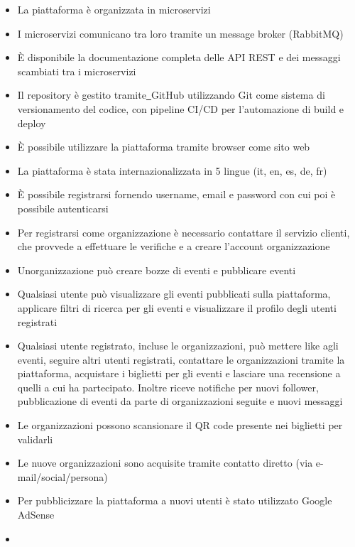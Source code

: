 \documentclass[11pt,a4paper]{article}
\providecommand{\tightlist}{\setlength{\itemsep}{0pt}\setlength{\parskip}{0pt}}
\begin{document}
\begin{itemize}
\tightlist
\item
  {La piattaforma è organizzata in microservizi }
\item
  {I microservizi comunicano tra loro tramite un message broker (RabbitMQ)}
\item
  {È disponibile la documentazione completa delle API REST e dei messaggi scambiati tra i microservizi}
\item
  {Il repository è gestito tramite}{\href{https://www.google.com/url?q=https://github.com?utm_source\%3Dchatgpt.com&sa=D&source=editors&ust=1779895503448419&usg=AOvVaw2jJ5FpVsgQ4hFvQu20lJHB}{~}}{GitHub utilizzando Git come sistema di versionamento del codice, con pipeline CI/CD per l’automazione di build e deploy}
\item
  {È possibile utilizzare la piattaforma tramite browser come sito web}
\item
  {La piattaforma è stata internazionalizzata in 5 lingue (it, en, es, de, fr)}
\item
  {È possibile registrarsi fornendo username, email e password con cui poi è possibile autenticarsi}
\item
  {Per registrarsi come organizzazione è necessario contattare il servizio clienti, che provvede a effettuare le verifiche e a creare l'account organizzazione}
\item
  {Un\textquotesingle organizzazione può creare bozze di eventi e pubblicare eventi}
\item
  {Qualsiasi utente può visualizzare gli eventi pubblicati sulla piattaforma, applicare filtri di ricerca per gli eventi e visualizzare il profilo degli utenti registrati}
\item
  {Qualsiasi utente registrato, incluse le organizzazioni, può mettere like agli eventi, seguire altri utenti registrati, contattare le organizzazioni tramite la piattaforma, acquistare i biglietti per gli eventi e lasciare una recensione a quelli a cui ha partecipato. Inoltre riceve notifiche per nuovi follower, pubblicazione di eventi da parte di organizzazioni seguite e nuovi messaggi}
\item
  {Le organizzazioni possono scansionare il QR code presente nei biglietti per }{validarli}
\item
  {Le nuove organizzazioni sono acquisite tramite contatto diretto (via e-mail/social/persona)}
\item
  {Per pubblicizzare la piattaforma a nuovi utenti è stato utilizzato Google AdSense}
\item

\end{itemize}
\end{document}
